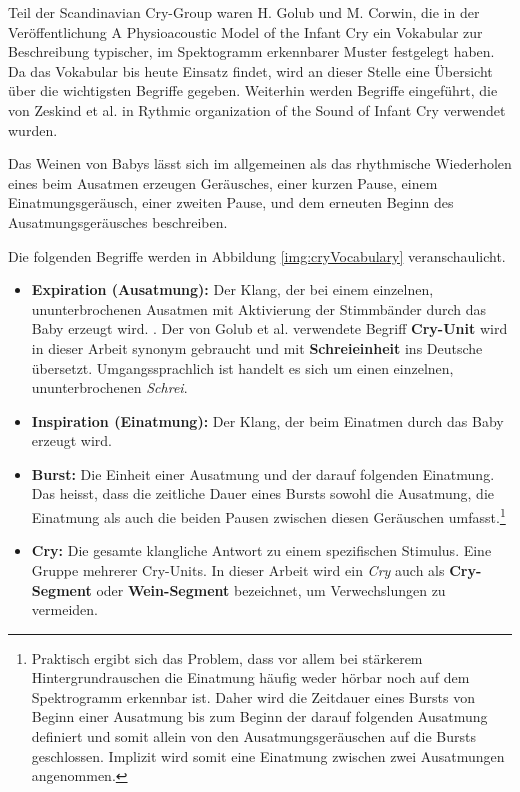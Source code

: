 Teil der Scandinavian Cry-Group waren H. Golub und M. Corwin, die in der Veröffentlichung \glqq A Physioacoustic Model of the Infant Cry\grqq \cite{cryModel} ein Vokabular zur Beschreibung typischer, im Spektogramm erkennbarer Muster festgelegt haben. Da das Vokabular bis heute Einsatz findet, wird an dieser Stelle eine Übersicht über die wichtigsten Begriffe gegeben. Weiterhin werden Begriffe eingeführt, die von Zeskind et al. in \glqq Rythmic organization of the Sound of Infant Cry\grqq{} verwendet wurden.\cite{rythmic}

Das Weinen von Babys lässt sich im allgemeinen als das \glqq rhythmische Wiederholen eines beim Ausatmen erzeugen Geräusches, einer kurzen Pause, einem Einatmungsgeräusch, einer zweiten Pause, und dem erneuten Beginn des Ausatmungsgeräusches\grqq{} beschreiben.\cite{wolff}

Die folgenden Begriffe werden in Abbildung \ref{img:cryVocabulary} veranschaulicht.

\begin{itemize}
	\item \textbf{Expiration (Ausatmung):} Der Klang, der bei einem einzelnen, ununterbrochenen Ausatmen mit Aktivierung der Stimmbänder durch das Baby erzeugt wird. \cite{rythmic}. Der von Golub et al. \cite[S. 61]{cryModel} verwendete Begriff \textbf{Cry-Unit} wird in dieser Arbeit synonym gebraucht und mit \textbf{Schreieinheit} ins Deutsche übersetzt. Umgangssprachlich ist handelt es sich um einen einzelnen, ununterbrochenen \emph{Schrei}.
	\item \textbf{Inspiration (Einatmung):} Der Klang, der beim Einatmen durch das Baby erzeugt wird.
	\item  \textbf{Burst:} Die Einheit einer Ausatmung und der darauf folgenden Einatmung. Das heisst, dass die zeitliche Dauer eines Bursts sowohl die Ausatmung, die Einatmung als auch die beiden Pausen zwischen diesen Geräuschen umfasst.\cite{rythmic}\footnote{Praktisch ergibt sich das Problem, dass vor allem bei stärkerem Hintergrundrauschen die Einatmung häufig weder hörbar noch auf dem Spektrogramm erkennbar ist. Daher wird die Zeitdauer eines Bursts von Beginn einer Ausatmung bis zum Beginn der darauf folgenden Ausatmung definiert und somit allein von den Ausatmungsgeräuschen auf die Bursts geschlossen. Implizit wird somit eine Einatmung zwischen zwei Ausatmungen angenommen.}
	\item  \textbf{Cry:} Die gesamte klangliche Antwort zu einem spezifischen Stimulus. Eine Gruppe mehrerer Cry-Units.\cite[S. 61]{cryModel} In dieser Arbeit wird ein \emph{Cry} auch als \textbf{Cry-Segment} oder \textbf{Wein-Segment} bezeichnet, um Verwechslungen zu vermeiden.
\end{itemize}

